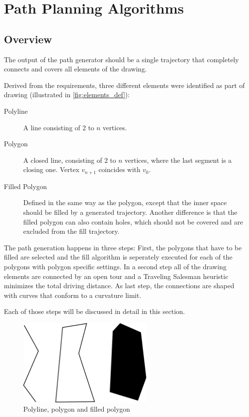 \chapter{Path Planning Algorithms}
\section{Overview}

The output of the path generator should be a single trajectory that completely connects and covers all elements of the drawing.

Derived from the requirements, three different elements were identified as part of drawing (illustrated in \autoref{fig:elements_def}):

\begin{description}
\item[Polyline] A line consisting of $2$ to $n$ vertices.
\item[Polygon] A closed line, consisting of $2$ to $n$ vertices, where the last segment is a closing one. Vertex $v_{n+1}$ coincides with $v_0$.
\item[Filled Polygon] Defined in the same way as the polygon, except that the inner space should be filled by a generated trajectory. Another difference is that the filled polygon can also contain holes, which should not be covered and are excluded from the fill trajectory.
\end{description}

The path generation happens in three steps: First, the polygons that have to be filled are selected and the fill algorithm is seperately executed for each of the polygons with polygon specific settings. In a second step all of the drawing elements are connected by an open tour and a Traveling Salesman heuristic minimizes the total driving distance. As last step, the connections are shaped with curves that conform to  a curvature limit.

Each of those steps will be discussed in detail in this section.

\begin{figure}
\centering
\includegraphics[width=0.6\textwidth]{images/path_planning/line_polygon_definition.pdf}
\caption{Polyline, polygon and filled polygon}
\label{fig:elements_def}
\end{figure}

